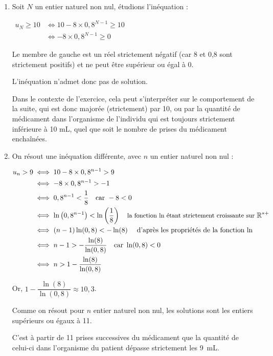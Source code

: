 \documentclass[10pt]{article}
\providecommand{\R}{\mathbb{R}}
\providecommand{\np}[2][]{{#2~#1}}
\begin{document}
\begin{enumerate}
Par limite de la somme, on en déduit : \quad $\lim\limits_{n\to +\infty} u_n = \lim\limits_{n\to +\infty} = 10 + 0 = 10$.

La suite $(u_n)$ converge donc vers 10.

Dans le contexte de l'exercice, cela signifie qu'au bout d'un nombre important de prises de ce médicament, l'organisme du patient contiendra une quantité de médicament qui tend vers les 10 mL.

	\item Soit $N$ un entier naturel non nul, étudions l'inéquation :

$\begin{aligned}
	u_N \geqslant 10
	&\iff 10 - 8 \times 0,8^{N-1} \geqslant 10\\
	&\iff -8\times 0,8^{N-1} \geqslant 0
\end{aligned} $

Le membre de gauche est un réel strictement négatif (car 8 et 0,8 sont strictement positifs) et ne peut être supérieur ou égal à 0.

L'inéquation n'admet donc pas de solution.

Dans le contexte de l'exercice, cela peut s'interpréter sur le comportement de la suite, qui est donc majorée (strictement) par 10, ou par la quantité de médicament dans l'organisme de l'individu qui est toujours strictement inférieure à 10 mL, quel que soit le nombre de prises du médicament enchaînées.

	\item On résout une inéquation différente, avec $n$ un entier naturel non nul :

$ \begin{aligned}
		u_n > 9
		&\iff 10 - 8 \times 0,8^{n-1} > 9\\
		&\iff - 8 \times 0,8^{n-1} > -1\\
		&\iff 0,8^{n-1} < \dfrac{1}{8} \quad \text{car } -8<0\\
		&\iff \ln\left(0,8^{n-1}\right) < \ln\left(\dfrac{1}{8}\right) \quad {\small \text{la fonction ln étant strictement croissante sur }\R^{*+}} \\
		&\iff (n-1)\ln(0,8) < -\ln(8) \quad \text{ d'après les propriétés de la fonction ln}\\
		&\iff n-1 > -\dfrac{\ln(8)}{\ln(0,8)} \quad \text{car } \ln(0,8) < 0\\
		&\iff n > 1 - \dfrac{\ln(8)}{\ln(0,8)}
\end{aligned}$

Or, $1 - \dfrac{\ln(8)}{\ln(0,8)} \approx 10,3$.

Comme on résout pour $n$ entier naturel non nul, les solutions sont les entiers supérieurs ou égaux à 11.

C'est à partir de 11 prises successives du médicament que la quantité de celui-ci dans l'organisme du patient dépasse strictement les \np[mL]{9}.
\end{enumerate}
\end{document}
